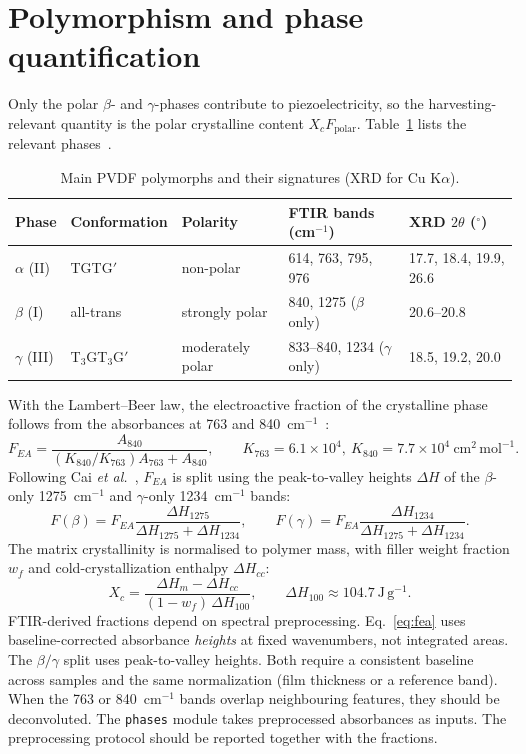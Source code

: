 \documentclass[11pt,a4paper]{article}
\newcommand{\Fp}{F_{\mathrm{polar}}}
\begin{document}
\section{Polymorphism and phase quantification}

Only the polar $\beta$- and $\gamma$-phases contribute to piezoelectricity, so the harvesting-relevant quantity is the polar crystalline content $X_c\Fp$. Table~\ref{tab:phases} lists the relevant phases~\cite{Lovinger1983,Martins2014,Cai2017}.

\begin{table}[htbp]
\centering
\caption{Main PVDF polymorphs and their signatures (XRD for Cu K$\alpha$).}
\label{tab:phases}
\small
\begin{tabular}{lllll}
\toprule
Phase & Conformation & Polarity & FTIR bands (cm$^{-1}$) & XRD $2\theta$ ($^\circ$) \\
\midrule
$\alpha$ (II) & TGTG$'$ & non-polar & 614, 763, 795, 976 & 17.7, 18.4, 19.9, 26.6 \\
$\beta$ (I) & all-trans & strongly polar & 840, 1275 ($\beta$ only) & 20.6--20.8 \\
$\gamma$ (III) & T$_3$GT$_3$G$'$ & moderately polar & 833--840, 1234 ($\gamma$ only) & 18.5, 19.2, 20.0 \\
\bottomrule
\end{tabular}
\end{table}

With the Lambert--Beer law, the electroactive fraction of the crystalline phase follows from the absorbances at 763 and 840~cm$^{-1}$~\cite{Gregorio1994}:
\begin{equation}
F_{EA} = \frac{A_{840}}{(K_{840}/K_{763})A_{763} + A_{840}},\qquad K_{763}=6.1\times10^4,\ K_{840}=7.7\times10^4\ \mathrm{cm^2\,mol^{-1}}.
\label{eq:fea}
\end{equation}
Following Cai \emph{et al.}~\cite{Cai2017}, $F_{EA}$ is split using the peak-to-valley heights $\Delta H$ of the $\beta$-only 1275~cm$^{-1}$ and $\gamma$-only 1234~cm$^{-1}$ bands:
\begin{equation}
F(\beta)=F_{EA}\frac{\Delta H_{1275}}{\Delta H_{1275}+\Delta H_{1234}},\qquad
F(\gamma)=F_{EA}\frac{\Delta H_{1234}}{\Delta H_{1275}+\Delta H_{1234}}.
\end{equation}
The matrix crystallinity is normalised to polymer mass, with filler weight fraction $w_f$ and cold-crystallization enthalpy $\Delta H_{cc}$:
\begin{equation}
X_c=\frac{\Delta H_m-\Delta H_{cc}}{(1-w_f)\,\Delta H_{100}},\qquad \Delta H_{100}\approx104.7\ \mathrm{J\,g^{-1}}.
\end{equation}
FTIR-derived fractions depend on spectral preprocessing. Eq.~\eqref{eq:fea} uses baseline-corrected absorbance \emph{heights} at fixed wavenumbers, not integrated areas. The $\beta/\gamma$ split uses peak-to-valley heights. Both require a consistent baseline across samples and the same normalization (film thickness or a reference band). When the 763 or 840~cm$^{-1}$ bands overlap neighbouring features, they should be deconvoluted. The \texttt{phases} module takes preprocessed absorbances as inputs. The preprocessing protocol should be reported together with the fractions.
\end{document}
